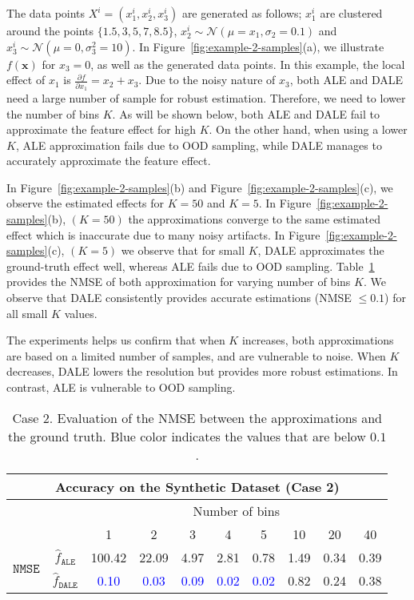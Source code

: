 \documentclass[wcp]{jmlr}
\newcommand{\dale}{\hat{f}_{\mathtt{DALE}}}
\newcommand{\alep}{\hat{f}_{\mathtt{ALE}}}
\newcommand{\xb}{\mathbf{x}} \newcommand{\R}{\mathbb{R}}
\begin{document}
\noindent
%
The data points \(X^i = (x_1^i, x_2^i, x_3^i)\) are generated as follows; \(x_1^i \) are clustered around the points \(\{1.5, 3, 5, 7, 8.5\}\), \(x_2^i \sim \mathcal{N}(\mu=x_1, \sigma_2=0.1) \) and \(x_3^i \sim \mathcal{N}(\mu=0, \sigma_3^2=10) \). In Figure~\ref{fig:example-2-samples}(a), we illustrate \(f(\xb)\) for \(x_3=0\), as well as the generated data points. In this example, the local effect of \(x_1\) is \(\frac{\partial f}{\partial x_1} = x_2 + x_3\). Due to the noisy nature of \(x_3\), both ALE and DALE need a large number of sample for robust estimation. Therefore, we need to lower the number of bins \(K\). As will be shown below, both ALE and DALE fail to approximate the feature effect for high \(K\). On the other hand, when using a lower \(K\), ALE approximation fails due to OOD sampling, while DALE manages to accurately approximate the feature effect.

In Figure~\ref{fig:example-2-samples}(b) and Figure~\ref{fig:example-2-samples}(c), we observe the estimated effects for \(K=50\) and \(K=5\). In Figure~\ref{fig:example-2-samples}(b), \((K=50)\) the approximations converge to the same estimated effect which is inaccurate due to many noisy artifacts. In Figure~\ref{fig:example-2-samples}(c), \((K=5)\) we observe that for small \(K\), DALE approximates the ground-truth effect well, whereas ALE fails due to OOD sampling. Table~\ref{tab:case-2-accuracy} provides the NMSE of both approximation for varying number of bins \(K\). We observe that DALE consistently provides accurate estimations (NMSE \(\leq 0.1\)) for all small \(K\) values.

The experiments helps us confirm that when \(K \) increases, both approximations are based on a limited number of samples, and are vulnerable to noise. When \(K\) decreases, DALE lowers the resolution but provides more robust estimations. In contrast, ALE is vulnerable to OOD sampling.

\begin{table} \centering
  \caption{Case 2. Evaluation of the NMSE between the approximations and the ground truth. Blue color indicates the values that are below \(0.1\).}
  \label{tab:case-2-accuracy}
  \begin{tabular}{c|c|c|c|c|c|c|c|c|c}
    \multicolumn{10}{c}{Accuracy on the Synthetic Dataset (Case 2)} \\
    \hline \hline & & \multicolumn{8}{|c}{Number of bins} \\
    \hline & & 1 & 2 & 3 & 4 & 5 & 10 & 20 & 40 \\
    \hline \hline \multirow{2}{*}{\(\mathtt{NMSE}\)} & \(\alep\) & 100.42 & 22.09 & 4.97 & 2.81 & 0.78 & 1.49 & 0.34 & 0.39 \\
    & \(\dale\) & \textcolor{blue}{0.10} & \textcolor{blue}{0.03} & \textcolor{blue}{0.09} & \textcolor{blue}{0.02} & \textcolor{blue}{0.02} & 0.82 & 0.24 & 0.38 \\
    \hline
  \end{tabular}
\end{table}
\end{document}
